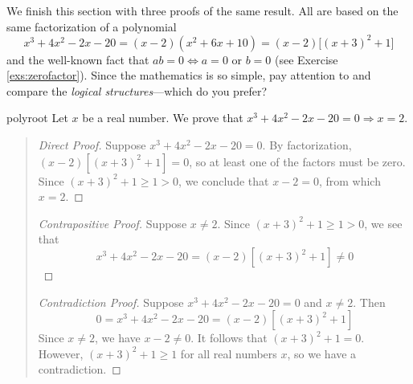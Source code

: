 
We finish this section with three proofs of the same result. All are based on the same factorization of a polynomial
\[
	x^3+4x^2-2x-20=(x-2)(x^2+6x+10)=(x-2)\bigl[(x+3)^2+1\bigr]
\]
and the well-known fact that $ab=0\iff a=0$ or $b=0$ (see Exercise \ref{exs:zerofactor}). Since the mathematics is so simple, pay attention to and compare the \emph{logical structures}---which do you prefer?

\begin{example}{}{polyroot}
	Let $x$ be a real number. We prove that $x^3+4x^2-2x-20=0\Longrightarrow x=2$.
	\begin{quote}
		\begin{proof}[Direct Proof]
			Suppose $x^3+4x^2-2x-20=0$. By factorization, $(x-2)[(x+3)^2+1]=0$, so at least one of the factors must be zero. Since $(x+3)^2+1\ge 1>0$, we conclude that $x-2=0$, from which $x=2$.
		\end{proof}
	
		\begin{proof}[Contrapositive Proof]
		Suppose $x\neq 2$. Since $(x+3)^2+1\ge 1>0$, we see that
			\[
				x^3+4x^2-2x-20=(x-2)[(x+3)^2+1]\neq 0 \tag*{\qedhere}
			\]
		\end{proof}
	
		\begin{proof}[Contradiction Proof]
			Suppose $x^3+4x^2-2x-20=0$ and $x\neq 2$. Then
			\[
				0=x^3+4x^2-2x-20=(x-2)[(x+3)^2+1]
			\]
			Since $x\neq 2$, we have $x-2\neq 0$. It follows that $(x+3)^2+1=0$. However, $(x+3)^2+1\ge 1$ for all real numbers $x$, so we have a contradiction.
		\end{proof}
	\end{quote}
\end{example}



